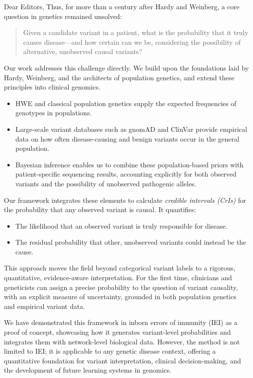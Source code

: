\documentclass[12pt,a4paper]{letter}
\begin{document}
\begin{letter}{Dear Editors,}
Thus, for more than a century after Hardy and Weinberg, a core question in genetics remained unsolved:

\begin{quote}
Given a candidate variant in a patient, what is the probability that it truly causes disease---and how certain can we be, considering the possibility of alternative, unobserved causal variants?
\end{quote}

Our work addresses this challenge directly. We build upon the foundations laid by Hardy, Weinberg, and the architects of population genetics, and extend these principles into clinical genomics.

\begin{itemize}
    \item HWE and classical population genetics supply the expected frequencies of genotypes in populations.
    \item Large-scale variant databases such as gnomAD and ClinVar provide empirical data on how often disease-causing and benign variants occur in the general population.
    \item Bayesian inference enables us to combine these population-based priors with patient-specific sequencing results, accounting explicitly for both observed variants and the possibility of unobserved pathogenic alleles.
\end{itemize}

Our framework integrates these elements to calculate \emph{credible intervals (CrIs)} for the probability that any observed variant is causal. It quantifies:

\begin{itemize}
    \item The likelihood that an observed variant is truly responsible for disease.
    \item The residual probability that other, unobserved variants could instead be the cause.
\end{itemize}

This approach moves the field beyond categorical variant labels to a rigorous, quantitative, evidence-aware interpretation. For the first time, clinicians and geneticists can assign a precise probability to the question of variant causality, with an explicit measure of uncertainty, grounded in both population genetics and empirical variant data.

We have demonstrated this framework in inborn errors of immunity (IEI) as a proof of concept, showcasing how it generates variant-level probabilities and integrates them with network-level biological data. However, the method is not limited to IEI; it is applicable to any genetic disease context, offering a quantitative foundation for variant interpretation, clinical decision-making, and the development of future learning systems in genomics.


\end{letter}
\end{document}
